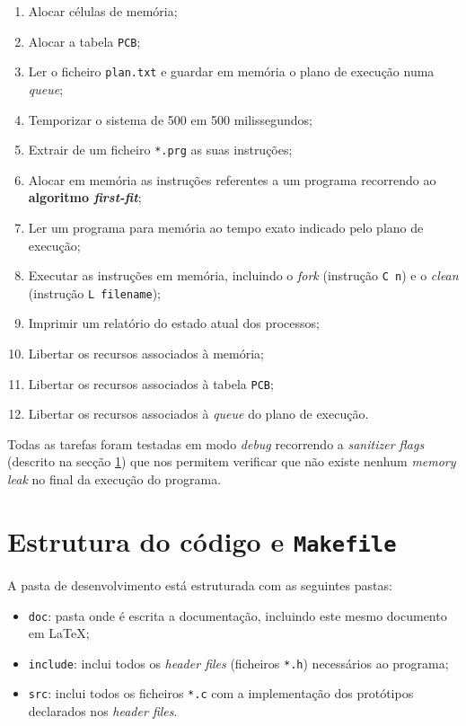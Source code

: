 \documentclass[a4paper,11pt,onecolumn,oneside]{article}
\begin{document}
	\begin{enumerate}
		\item Alocar células de memória;
		\item Alocar a tabela \texttt{\ac{PCB}};
		\item Ler o ficheiro \texttt{plan.txt} e guardar em memória o plano de execução numa \textit{queue};
		\item Temporizar o sistema de 500 em 500 milissegundos;
		\item Extrair de um ficheiro \texttt{*.prg} as suas instruções;
		\item Alocar em memória as instruções referentes a um programa recorrendo ao \textbf{algoritmo \textit{first-fit}};
		\item Ler um programa para memória ao tempo exato indicado pelo plano de execução;
		
		\item Executar as instruções em memória, incluindo o \textit{fork} (instrução \verb|C n|) e o \textit{clean} (instrução \verb|L filename|);
		
		
		\item Imprimir um relatório do estado atual dos processos;
		\item Libertar os recursos associados à memória;
		\item Libertar os recursos associados à tabela \texttt{\ac{PCB}};
		\item Libertar os recursos associados à \textit{queue} do plano de execução.
	\end{enumerate}
	
	Todas as tarefas foram testadas em modo \textit{debug} recorrendo a \textit{sanitizer flags} (descrito na secção \ref{sec:struct_makefile}) que nos permitem verificar que não existe nenhum \textit{memory leak} no final da execução do programa.
	
	
	\section{Estrutura do código e \texttt{Makefile}}
	\label{sec:struct_makefile}
	
	A pasta de desenvolvimento está estruturada com as seguintes pastas:
	
	\begin{itemize}
		\item \verb|doc|: pasta onde é escrita a documentação, incluindo este mesmo documento em \LaTeX;
		\item \verb|include|: inclui todos os \textit{header files} (ficheiros \verb|*.h|) necessários ao programa;
		\item \verb|src|: inclui todos os ficheiros \verb|*.c| com a implementação dos protótipos declarados nos \textit{header files}.
	\end{itemize}
	
\end{document}
